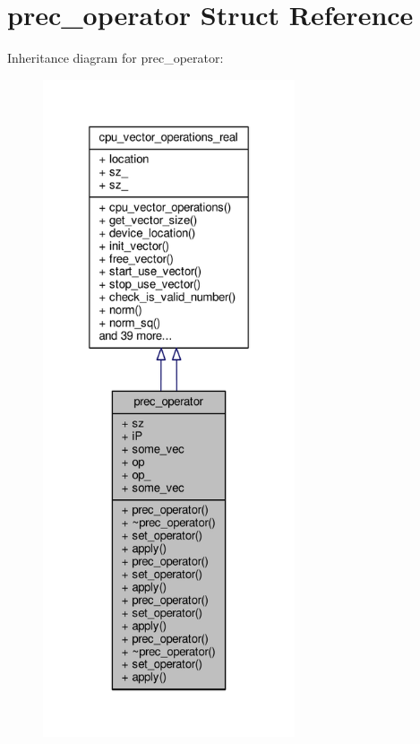 \hypertarget{structprec__operator}{\section{prec\-\_\-operator Struct Reference}
\label{structprec__operator}
}


Inheritance diagram for prec\-\_\-operator\-:\nopagebreak
\begin{figure}[H]
\begin{center}
\leavevmode
\includegraphics[height=550pt]{structprec__operator__inherit__graph}
\end{center}
\end{figure}


